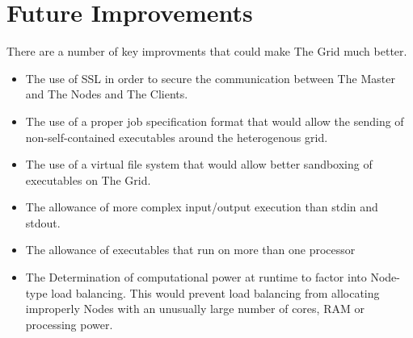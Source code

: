 \chapter{Future Improvements}
\label{futureimprovements}

There are a number of key improvments that could make The Grid much better.

\begin{itemize}
\item The use of SSL in order to secure the communication between The Master and The Nodes and The Clients.

\item The use of a proper job specification format that would allow the sending of non-self-contained executables around the heterogenous grid.

\item The use of a virtual file system that would allow better sandboxing of executables on The Grid.

\item The allowance of more complex input\slash output execution than stdin and stdout.

\item The allowance of executables that run on more than one processor

\item The Determination of computational power at runtime to factor into Node-type load balancing. This would prevent load balancing from allocating improperly Nodes with an unusually large number of cores, RAM or processing power.

\end{itemize}
